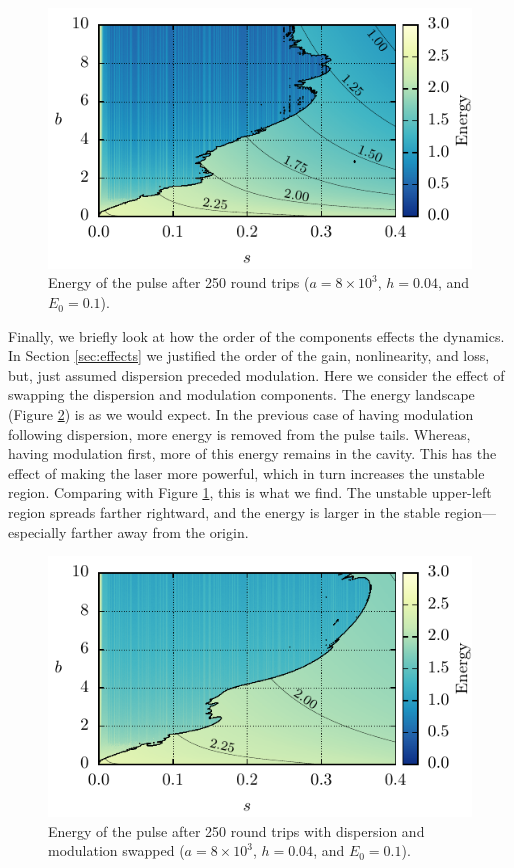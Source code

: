 \documentclass[10pt,twocolumn,a4paper]{article}
\begin{document}
\begin{figure}[tbp]
	\centering
	\includegraphics{ParamSpaceEnergy}
	\caption{Energy of the pulse after 250 round trips ($a = 8 \times 10^3$, $h = 0.04$, and $E_0 = 0.1$).}
	\label{fig:energy}
\end{figure}

Finally, we briefly look at how the order of the components effects the dynamics. In Section \ref{sec:effects} we justified the order of the gain, nonlinearity, and loss, but, just assumed dispersion preceded modulation. Here we consider the effect of swapping the dispersion and modulation components. The energy landscape (Figure \ref{fig:energyswitch}) is as we would expect. In the previous case of having modulation following dispersion, more energy is removed from the pulse tails. Whereas, having modulation first, more of this energy remains in the cavity. This has the effect of making the laser more powerful, which in turn increases the unstable region. Comparing with Figure \ref{fig:energy}, this is what we find. The unstable upper-left region spreads farther rightward, and the energy is larger in the stable region---especially farther away from the origin.

\begin{figure}[tbp]
	\centering
	\includegraphics{ParamSpaceEnergySwitch}
	\caption{Energy of the pulse after 250 round trips with dispersion and modulation swapped ($a = 8 \times 10^3$, $h = 0.04$, and $E_0 = 0.1$).}
	\label{fig:energyswitch}
\end{figure}
\end{document}
